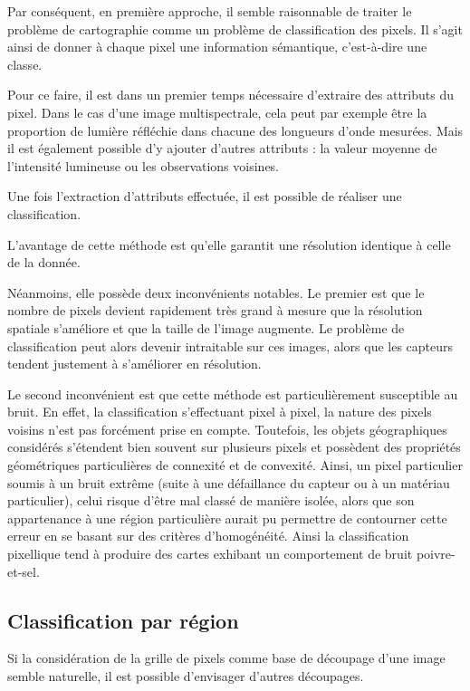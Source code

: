 Par conséquent, en première approche, il semble raisonnable de traiter le problème de cartographie comme un problème de classification des pixels. Il s'agit ainsi de donner à chaque pixel une information sémantique, c'est-à-dire une classe.

Pour ce faire, il est dans un premier temps nécessaire d'extraire des attributs du pixel. Dans le cas d'une image multispectrale, cela peut par exemple être la proportion de lumière réfléchie dans chacune des longueurs d'onde mesurées. Mais il est également possible d'y ajouter d'autres attributs : la valeur moyenne de l'intensité lumineuse ou les observations voisines.

Une fois l'extraction d'attributs effectuée, il est possible de réaliser une classification.

L'avantage de cette méthode est qu'elle garantit une résolution identique à celle de la donnée.

Néanmoins, elle possède deux inconvénients notables. Le premier est que le nombre de pixels devient rapidement très grand à mesure que la résolution spatiale s'améliore et que la taille de l'image augmente. Le problème de classification peut alors devenir intraitable sur ces images, alors que les capteurs tendent justement à s'améliorer en résolution.

Le second inconvénient est que cette méthode est particulièrement susceptible au bruit. En effet, la classification s'effectuant pixel à pixel, la nature des pixels voisins n'est pas forcément prise en compte. Toutefois, les objets géographiques considérés s'étendent bien souvent sur plusieurs pixels et possèdent des propriétés géométriques particulières de connexité et de convexité. Ainsi, un pixel particulier soumis à un bruit extrême (suite à une défaillance du capteur ou à un matériau particulier), celui risque d'être mal classé de manière isolée, alors que son appartenance à une région particulière aurait pu permettre de contourner cette erreur en se basant sur des critères d'homogénéité. Ainsi la classification pixellique tend à produire des cartes exhibant un comportement de bruit poivre-et-sel.

\subsection{Classification par région}

Si la considération de la grille de pixels comme base de découpage d'une image semble naturelle, il est possible d'envisager d'autres découpages.


